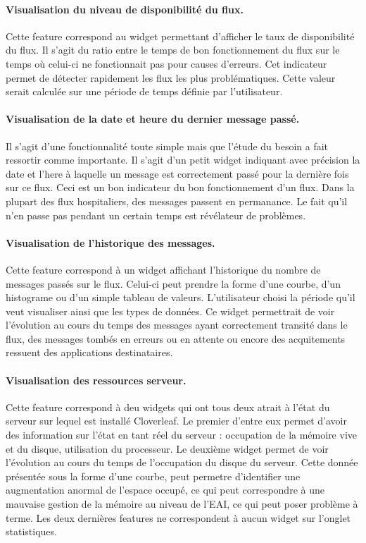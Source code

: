 			\paragraph{Visualisation du niveau de disponibilité du flux.}
			Cette feature correspond au widget permettant d'afficher le taux de
			disponibilité du flux. Il s'agit du ratio entre le temps de bon
			fonctionnement du flux sur le temps où celui-ci ne fonctionnait pas pour
			causes d'erreurs. Cet indicateur permet de détecter rapidement les flux les
			plus problématiques. Cette valeur serait calculée sur une période de temps
			définie par l'utilisateur.
			
			\paragraph{Visualisation de la date et heure du dernier message passé.}
			Il s'agit d'une fonctionnalité toute simple mais que l'étude du besoin a fait
			ressortir comme importante. Il s'agit d'un petit widget indiquant avec
			précision la date et l'here à laquelle un message est correctement passé pour
			la dernière fois sur ce flux. Ceci est un bon indicateur du bon
			fonctionnement d'un flux. Dans la plupart des flux hospitaliers, des messages
			passent en permanance. Le fait qu'il n'en passe pas pendant un certain temps
			est révélateur de problèmes.
			
			\paragraph{Visualisation de l’historique des messages.}
			Cette feature correspond à un widget affichant l'historique du nombre de
			messages passés sur le flux. Celui-ci peut prendre la forme d'une courbe,
			d'un histograme ou d'un simple tableau de valeurs. L'utilisateur choisi la
			période qu'il veut visualiser ainsi que les types de données. Ce widget
			permettrait de voir l'évolution au cours du temps des messages ayant
			correctement transité dans le flux, des messages tombés en erreurs ou en
			attente ou encore des acquitements ressuent des applications destinataires.
			
			\paragraph{Visualisation des ressources serveur.}
			Cette feature correspond à deu widgets qui ont tous deux atrait à l'état du
			serveur sur lequel est installé Cloverleaf. Le premier d'entre eux permet
			d'avoir des information sur l'état en tant réel du serveur : occupation de la
			mémoire vive et du disque, utilisation du processeur. Le deuxième widget
			permet de voir l'évolution au cours du temps de l'occupation du disque du
			serveur. Cette donnée présentée sous la forme d'une courbe, peut permetre
			d'identifier une augmentation anormal de l'espace occupé, ce qui peut
			correspondre à une mauvaise gestion de la mémoire au niveau de l'EAI, ce qui
			peut poser problème à terme.\newline
			Les deux dernières features ne correspondent à aucun widget sur l'onglet
			statistiques.
			
